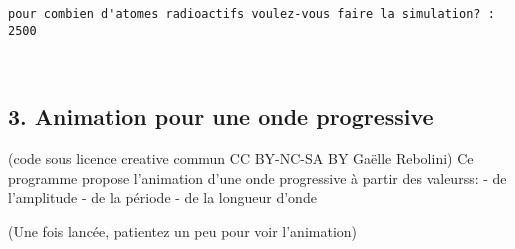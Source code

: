 \documentclass[11pt]{article}
\begin{document}
    \begin{Verbatim}[commandchars=\\\{\}]
pour combien d'atomes radioactifs voulez-vous faire la simulation? : 2500

    \end{Verbatim}

    \begin{center}
    \end{center}
    { \hspace*{\fill} \\}
    
    \hypertarget{animation-pour-une-onde-progressive}{%
\subsection{3. Animation pour une onde
progressive}\label{animation-pour-une-onde-progressive}}

(code sous licence creative commun CC BY-NC-SA BY Gaëlle Rebolini) Ce
programme propose l'animation d'une onde progressive à partir des
valeurss: - de l'amplitude - de la période - de la longueur d'onde

(Une fois lancée, patientez un peu pour voir l'animation)
\end{document}
